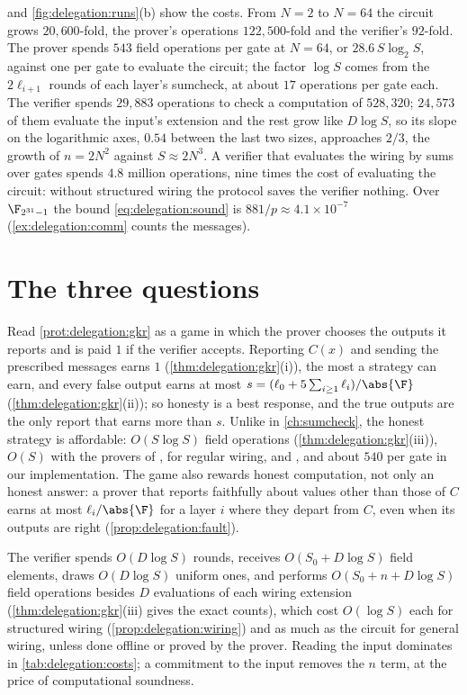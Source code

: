 \begin{refsection}
 and \cref{fig:delegation:runs}(b) show the costs. From $N=2$ to $N=64$ the circuit grows $20{,}600$-fold, the prover's operations $122{,}500$-fold and the verifier's $92$-fold. The prover spends $543$ field operations per gate at $N=64$, or $28.6\,S\log_2S$, against one per gate to evaluate the circuit; the factor $\log S$ comes from the $2\ell_{i+1}$ rounds of each layer's sumcheck, at about $17$ operations per gate each. The verifier spends $29{,}883$ operations to check a computation of $528{,}320$; $24{,}573$ of them evaluate the input's extension and the rest grow like $D\log S$, so its slope on the logarithmic axes, $0.54$ between the last two sizes, approaches $2/3$, the growth of $n=2N^2$ against $S\approx2N^3$. A verifier that evaluates the wiring by sums over gates spends $4.8$ million operations, nine times the cost of evaluating the circuit: without structured wiring the protocol saves the verifier nothing. Over $\F_{2^{31}-1}$ the bound \eqref{eq:delegation:sound} is $881/p\approx4.1\times10^{-7}$ (\cref{ex:delegation:comm} counts the messages).

\section{The three questions}\label{sec:delegation:questions}

\questionone Read \cref{prot:delegation:gkr} as a game in which the prover chooses the outputs it reports and is paid $1$ if the verifier accepts. Reporting $C(x)$ and sending the prescribed messages earns $1$ (\cref{thm:delegation:gkr}(i)), the most a strategy can earn, and every false output earns at most $s=(\ell_0+5\sum_{i\ge1}\ell_i)/\abs{\F}$ (\cref{thm:delegation:gkr}(ii)); so honesty is a best response, and the true outputs are the only report that earns more than $s$. Unlike in \cref{ch:sumcheck}, the honest strategy is affordable: $O(S\log S)$ field operations (\cref{thm:delegation:gkr}(iii)), $O(S)$ with the provers of \textcite{Thaler2013}, for regular wiring, and \textcite{XieEtAl2019}, and about $540$ per gate in our implementation. The game also rewards honest computation, not only an honest answer: a prover that reports faithfully about values other than those of $C$ earns at most $\ell_i/\abs{\F}$ for a layer $i$ where they depart from $C$, even when its outputs are right (\cref{prop:delegation:fault}).

\questiontwo The verifier spends $O(D\log S)$ rounds, receives $O(S_0+D\log S)$ field elements, draws $O(D\log S)$ uniform ones, and performs $O(S_0+n+D\log S)$ field operations besides $D$ evaluations of each wiring extension (\cref{thm:delegation:gkr}(iii) gives the exact counts), which cost $O(\log S)$ each for structured wiring (\cref{prop:delegation:wiring}) and as much as the circuit for general wiring, unless done offline or proved by the prover. Reading the input dominates in \cref{tab:delegation:costs}; a commitment to the input removes the $n$ term, at the price of computational soundness.


\end{refsection}
